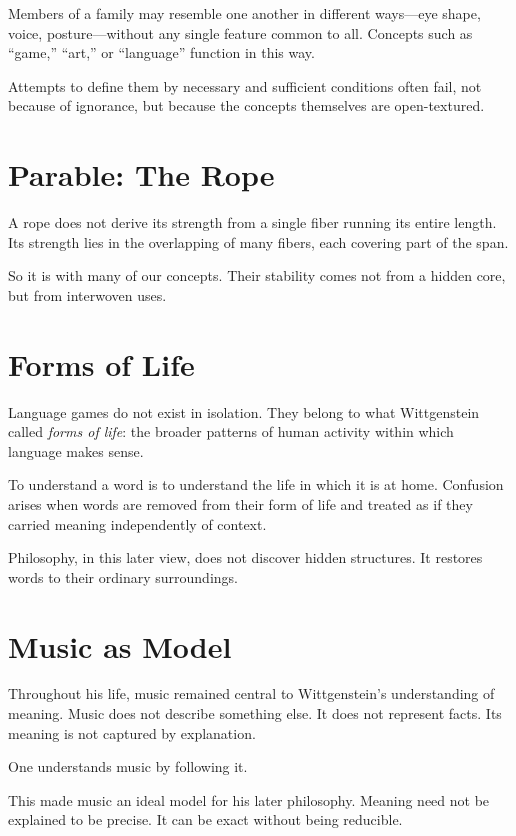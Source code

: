 \documentclass[11pt]{article}
\begin{document}
Members of a family may resemble one another in different ways—eye shape, voice, posture—without any single feature common to all. Concepts such as “game,” “art,” or “language” function in this way.

Attempts to define them by necessary and sufficient conditions often fail, not because of ignorance, but because the concepts themselves are open-textured.

\section*{Parable: The Rope}

A rope does not derive its strength from a single fiber running its entire length. Its strength lies in the overlapping of many fibers, each covering part of the span.

So it is with many of our concepts. Their stability comes not from a hidden core, but from interwoven uses.

\section*{Forms of Life}

Language games do not exist in isolation. They belong to what Wittgenstein called \emph{forms of life}: the broader patterns of human activity within which language makes sense.

To understand a word is to understand the life in which it is at home. Confusion arises when words are removed from their form of life and treated as if they carried meaning independently of context.

Philosophy, in this later view, does not discover hidden structures. It restores words to their ordinary surroundings.

\section*{Music as Model}

Throughout his life, music remained central to Wittgenstein’s understanding of meaning. Music does not describe something else. It does not represent facts. Its meaning is not captured by explanation.

One understands music by following it.

This made music an ideal model for his later philosophy. Meaning need not be explained to be precise. It can be exact without being reducible.
\end{document}
